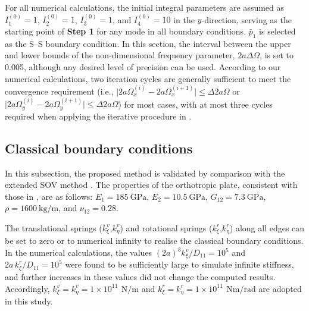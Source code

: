 \documentclass[preprint,12pt,number]{elsarticle}
\newcommand{\urho}{~\unit{\kilogram\per\meter}\xspace}
\newcommand{\ustif}{~\unit{\newton\per\metre}\xspace}
\newcommand{\ustifrot}{~\unit{\newton\metre\per\radian}\xspace}
\newcommand{\nugpa}{~\si{\giga\pascal}\xspace}
\begin{document}
For all numerical calculations, the initial integral parameters are assumed as $I^{(0)}_1=1$, $I^{(0)}_2=1$, $I^{(0)}_3=1$, and $I^{(0)}_4=10$ in the $y$-direction, serving as the starting point of \textbf{Step 1} for any mode in all boundary conditions.  
$\bar{p}_1$ is selected as the S–S boundary condition.
In this section, the interval between the upper and lower bounds of the non-dimensional frequency parameter, $2a\Delta\Omega$, is set to 0.005, although any desired level of precision can be used.
According to our numerical calculations, two iteration cycles are generally sufficient to meet the convergence requirement (i.e., $\lvert 2a\Omega^{(i)}_{x} - 2a\Omega^{(i+1)}_{x} \rvert \leq \Delta 2a\Omega$ or $\lvert 2a\Omega^{(i)}_{y} - 2a\Omega^{(i+1)}_{y} \rvert \leq \Delta 2a\Omega$) for most cases, with at most three cycles required when applying the iterative procedure in .



\subsection{Classical boundary conditions}\label{sec:Classical boundary conditions}
In this subsection, the proposed method is validated by comparison with the extended SOV method \cite{xing2020extended}.  
The properties of the orthotropic plate, consistent with those in \cite{xing2020extended}, are as follows:  
$E_1 = 185 \nugpa$, $E_2 = 10.5 \nugpa$, $G_{12} = 7.3 \nugpa$, $\rho = 1600 \urho$, and $\nu_{12} = 0.28$.

The translational springs ($k^{v}_{\xi}$,$k^{v}_{\eta}$) and rotational springs ($k^{r}_{\xi}$,$k^{r}_{\eta}$) along all edges can be set to zero or to numerical infinity to realise the classical boundary conditions. 
In the numerical calculations, the values $(2a)^{3} k^{v}_{\xi} / D_{11} = 10^{5}$ and $2a\, k^{r}_{\xi} / D_{11} = 10^{5}$ were found to be sufficiently large to simulate infinite stiffness, and further increases in these values did not change the computed results. 
Accordingly, $k^{v}_{\xi}=k^{v}_{\eta} = 1\times 10^{11}\,\ustif$ and $k^{r}_{\xi}=k^{r}_{\eta} = 1\times 10^{11}\,\ustifrot$ are adopted in this study.
\end{document}
